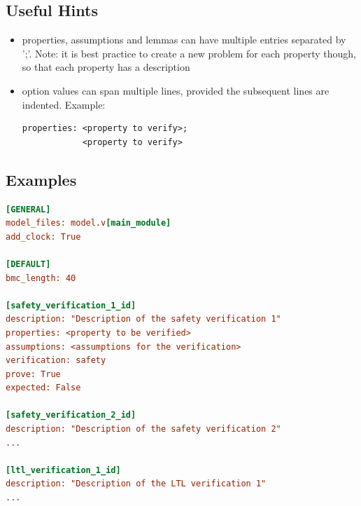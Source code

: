 \documentclass{article}
\theoremstyle{definition}
\begin{document}
\subsection{Useful Hints}
\label{problem.hints}

\begin{itemize}
  \item properties, assumptions and lemmas can have multiple entries separated
    by ';'. Note: it is best practice to create a new problem for each property
    though, so that each property has a description
  \item option values can span multiple lines, provided the subsequent lines are
    indented. Example:
\begin{lstlisting}
properties: <property to verify>;
            <property to verify>
\end{lstlisting}
\end{itemize}

\subsection{Examples}
\label{problem.examples}

\begin{lstlisting}[frame=single,language=Ini,caption=Problem file example,label=problem_file]
[GENERAL]
model_files: model.v[main_module]
add_clock: True

[DEFAULT]
bmc_length: 40

[safety_verification_1_id]
description: "Description of the safety verification 1"
properties: <property to be verified>
assumptions: <assumptions for the verification>
verification: safety
prove: True
expected: False

[safety_verification_2_id]
description: "Description of the safety verification 2"
...

[ltl_verification_1_id]
description: "Description of the LTL verification 1"
...

\end{lstlisting}
\end{document}
